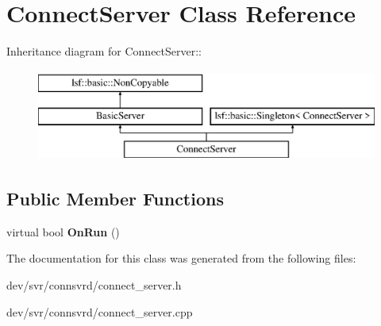 \hypertarget{classConnectServer}{
\section{ConnectServer Class Reference}
\label{classConnectServer}
}
Inheritance diagram for ConnectServer::\begin{figure}[H]
\begin{center}
\leavevmode
\includegraphics[height=3cm]{classConnectServer}
\end{center}
\end{figure}
\subsection*{Public Member Functions}
\begin{DoxyCompactItemize}
\item 
\hypertarget{classConnectServer_a080915f3a45faef9c4e27d9cc9299d75}{
virtual bool {\bfseries OnRun} ()}
\label{classConnectServer_a080915f3a45faef9c4e27d9cc9299d75}

\end{DoxyCompactItemize}


The documentation for this class was generated from the following files:\begin{DoxyCompactItemize}
\item 
dev/svr/connsvrd/connect\_\-server.h\item 
dev/svr/connsvrd/connect\_\-server.cpp\end{DoxyCompactItemize}
